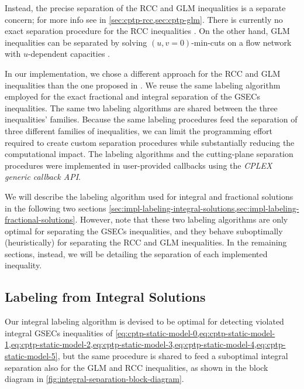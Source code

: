 Instead, the precise separation of the RCC and GLM inequalities
is a separate concern; for more info see in \cref{sec:cptp-rcc,sec:cptp-glm}.
There is currently
no exact separation procedure for the RCC inequalities  \parencite{jepsen2014}.
On the other hand, GLM inequalities can be separated by solving
$(u, v=0)$-min-cuts on a flow network with $u$-dependent capacities \parencite{letchford2006, jepsen2014}.

\medskip

In our implementation, we chose a different approach for the RCC and GLM inequalities
than the one proposed in \textcite{jepsen2014}.
We reuse the same labeling algorithm
employed for the exact fractional and integral separation of the GSECs inequalities.
The same two labeling algorithms are shared between the three inequalities' families.
Because the same labeling procedures feed the separation of three different families of inequalities,
we can limit the programming effort required to create custom separation procedures
while substantially reducing the computational impact.
The labeling algorithms and the cutting-plane separation procedures
were implemented in user-provided callbacks using the \textit{CPLEX generic callback API}.

\medskip

We will describe the labeling algorithm used for integral and fractional solutions
in the following two sections
\cref{sec:impl-labeling-integral-solutions,sec:impl-labeling-fractional-solutions}.
However, note that these two labeling algorithms
are only optimal for separating the GSECs inequalities,
and they behave suboptimally (heuristically) for separating the RCC and GLM inequalities.
In the remaining sections, instead,
we will be detailing the separation of each implemented inequality.

\subsection{Labeling from Integral Solutions}
\label{sec:impl-labeling-integral-solutions}

Our integral labeling algorithm
is devised to be optimal for detecting violated integral GSECs inequalities
of \cref{eq:cptp-static-model-0,eq:cptp-static-model-1,eq:cptp-static-model-2,eq:cptp-static-model-3,eq:cptp-static-model-4,eq:cptp-static-model-5},
but the same procedure is shared
to feed a suboptimal integral separation also for the GLM and RCC inequalities,
as shown in the block diagram in \cref{fig:integral-separation-block-diagram}.


